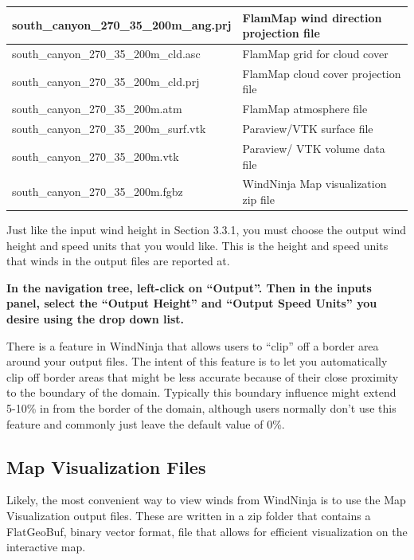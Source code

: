 \documentclass[12pt]{article}
\begin{document}
\begin{center}
\begin{tabular}{|l|l|}
\hline
south\_canyon\_270\_35\_200m\_ang.prj  & FlamMap wind direction projection file           \\ 
\hline
south\_canyon\_270\_35\_200m\_cld.asc  & FlamMap grid for cloud cover                    \\ 
\hline
south\_canyon\_270\_35\_200m\_cld.prj  & FlamMap cloud cover projection file              \\ 
\hline
south\_canyon\_270\_35\_200m.atm       & FlamMap atmosphere file                                  \\ 
\hline
south\_canyon\_270\_35\_200m\_surf.vtk & Paraview/VTK surface file                                \\ 
\hline
south\_canyon\_270\_35\_200m.vtk       & Paraview/ VTK volume data file                           \\
\hline
south\_canyon\_270\_35\_200m.fgbz      & WindNinja Map visualization zip file                     \\
\hline
\end{tabular}
\end{center}

Just like the input wind height in Section 3.3.1, you must choose the output wind height and speed units that you would like.  
This is the height and speed units that winds in the output files are reported at.

\textbf{\color{red} In the navigation tree, left-click on “Output”.  
Then in the inputs panel, select the “Output Height” and “Output Speed Units” you desire using the drop down list.}

There is a feature in WindNinja that allows users to “clip” off a border area around your output files.  
The intent of this feature is to let you automatically clip off border areas that might be less accurate because of their close proximity to the boundary of the domain.  
Typically this boundary influence might extend 5-10\% in from the border of the domain, although users normally don't use this feature and commonly just leave the default value of 0\%.

\subsection{Map Visualization Files}\label{Map Visualization}

Likely, the most convenient way to view winds from WindNinja is to use the Map Visualization output files. 
These are written in a zip folder that contains a FlatGeoBuf, binary vector format, file that allows for efficient visualization on the interactive map. 
\end{document}
